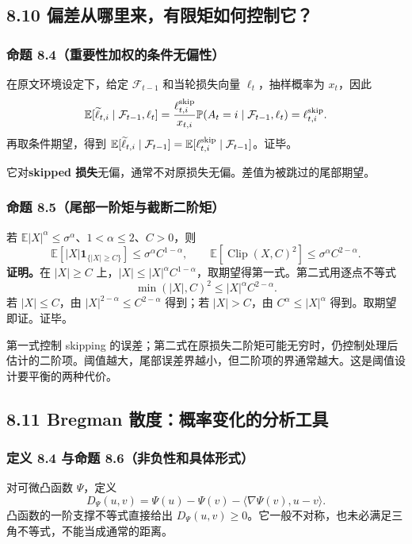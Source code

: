 \subsection{8.10 偏差从哪里来，有限矩如何控制它？}

\subsubsection{命题 8.4（重要性加权的条件无偏性）}
在原文环境设定下，给定 $\mathcal F_{t-1}$ 和当轮损失向量 $\ell_t$，抽样概率为 $x_t$，因此
\[
\mathbb E[\widetilde\ell_{t,i}\mid\mathcal F_{t-1},\ell_t]
=\frac{\ell^{\rm skip}_{t,i}}{x_{t,i}}\mathbb P(A_t=i\mid\mathcal F_{t-1},\ell_t)
=\ell^{\rm skip}_{t,i}.
\]
再取条件期望，得到
$\mathbb E[\widetilde\ell_{t,i}\mid\mathcal F_{t-1}]=\mathbb E[\ell^{\rm skip}_{t,i}\mid\mathcal F_{t-1}]$。证毕。

它对\textbf{skipped 损失}无偏，通常不对原损失无偏。差值为被跳过的尾部期望。

\subsubsection{命题 8.5（尾部一阶矩与截断二阶矩）}
若 $\mathbb E|X|^\alpha\le\sigma^\alpha$、$1<\alpha\le2$、$C>0$，则
\[
\mathbb E[|X|\mathbf1_{\{|X|\ge C\}}]\le\sigma^\alpha C^{1-\alpha},\qquad
\mathbb E[\operatorname{Clip}(X,C)^2]\le\sigma^\alpha C^{2-\alpha}.
\]
\textbf{证明。}在 $|X|\ge C$ 上，$|X|\le |X|^\alpha C^{1-\alpha}$，取期望得第一式。第二式用逐点不等式
\[
\min(|X|,C)^2\le |X|^\alpha C^{2-\alpha}.
\]
若 $|X|\le C$，由 $|X|^{2-\alpha}\le C^{2-\alpha}$ 得到；若 $|X|>C$，由 $C^\alpha\le|X|^\alpha$ 得到。取期望即证。证毕。

第一式控制 skipping 的误差；第二式在原损失二阶矩可能无穷时，仍控制处理后估计的二阶项。阈值越大，尾部误差界越小，但二阶项的界通常越大。这是阈值设计要平衡的两种代价。

\subsection{8.11 Bregman 散度：概率变化的分析工具}

\subsubsection{定义 8.4 与命题 8.6（非负性和具体形式）}
对可微凸函数 $\Psi$，定义
\[
D_\Psi(u,v)=\Psi(u)-\Psi(v)-\langle\nabla\Psi(v),u-v\rangle.
\]
凸函数的一阶支撑不等式直接给出 $D_\Psi(u,v)\ge0$。它一般不对称，也未必满足三角不等式，不能当成通常的距离。

